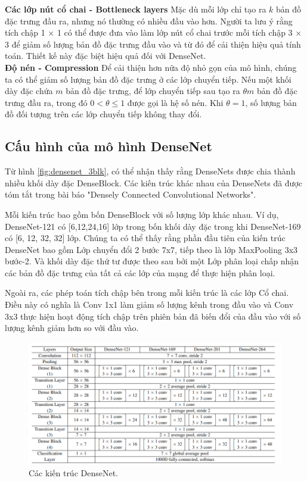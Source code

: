 {\bf Các lớp nút cổ chai - Bottleneck layers}
Mặc dù mỗi lớp chỉ tạo ra $k$ bản đồ đặc trưng đầu ra, nhưng nó thường có nhiều đầu vào hơn. Người ta lưu ý rằng tích chập 1 × 1 có thể được đưa vào làm lớp nút cổ chai trước mỗi tích chập 3 × 3 để giảm số lượng bản đồ đặc trưng đầu vào và từ đó để cải thiện hiệu quả tính toán. Thiết kế này đặc biệt hiệu quả đối với DenseNet.\\
{\bf Độ nén - Compression}
Để cải thiện hơn nữa độ nhỏ gọn của mô hình, chúng ta có thể giảm số lượng bản đồ đặc trưng ở các lớp chuyển tiếp. Nếu một khối dày đặc chứa $m$ bản đồ đặc trưng, để lớp chuyển tiếp sau tạo ra $\theta m$ bản đồ đặc trưng đầu ra, trong đó $0 < \theta \leq 1$ được gọi là hệ số nén. Khi $\theta = 1$, số lượng bản đồ đối tượng trên các lớp chuyển tiếp không thay đổi.

\subsection{Cấu hình của mô hình DenseNet}
Từ hình \ref{fig:densenet_3blk}, có thể nhận thấy rằng DenseNets được chia thành nhiều khối dày đặc DenseBlock. Các kiến trúc khác nhau của DenseNets đã được tóm tắt trong bài báo "Densely Connected Convolutional Networks"\cite{densenet}. 

Mỗi kiến trúc bao gồm bốn DenseBlock với số lượng lớp khác nhau. Ví dụ, DenseNet-121 có [6,12,24,16] lớp trong bốn khối dày đặc trong khi DenseNet-169 có [6, 12, 32, 32] lớp. Chúng ta có thể thấy rằng phần đầu tiên của kiến trúc DenseNet bao gồm Lớp chuyển đổi 2 bước 7x7, tiếp theo là lớp MaxPooling 3x3 bước-2. Và khối dày đặc thứ tư được theo sau bởi một Lớp phân loại chấp nhận các bản đồ đặc trưng của tất cả các lớp của mạng để thực hiện phân loại. 

Ngoài ra, các phép toán tích chập bên trong mỗi kiến trúc là các lớp Cổ chai. Điều này có nghĩa là Conv 1x1 làm giảm số lượng kênh trong đầu vào và Conv 3x3 thực hiện hoạt động tích chập trên phiên bản đã biến đổi của đầu vào với số lượng kênh giảm hơn so với đầu vào.
\begin{figure}[H]
	\centering
	\includegraphics[width=1\linewidth]{images/densenet_archtectures_for_imagenet}
	\caption{Các kiến trúc DenseNet.}
	\label{fig:densenet_archtectures_for_imagenet}
\end{figure}

